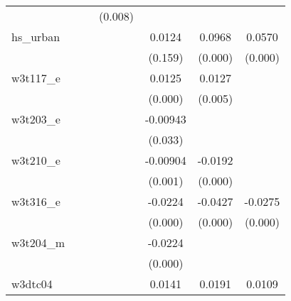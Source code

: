 {\begin{tabular}{l*{6}{c}}
            &                     &                     &     (0.008)         &                     &                     &                     \\
[1em]
hs\_urban    &                     &                     &                     &      0.0124         &      0.0968\sym{***}&      0.0570\sym{***}\\
            &                     &                     &                     &     (0.159)         &     (0.000)         &     (0.000)         \\
[1em]
w3t117\_e    &                     &                     &                     &      0.0125\sym{***}&      0.0127\sym{***}&                     \\
            &                     &                     &                     &     (0.000)         &     (0.005)         &                     \\
[1em]
w3t203\_e    &                     &                     &                     &    -0.00943\sym{**} &                     &                     \\
            &                     &                     &                     &     (0.033)         &                     &                     \\
[1em]
w3t210\_e    &                     &                     &                     &    -0.00904\sym{***}&     -0.0192\sym{***}&                     \\
            &                     &                     &                     &     (0.001)         &     (0.000)         &                     \\
[1em]
w3t316\_e    &                     &                     &                     &     -0.0224\sym{***}&     -0.0427\sym{***}&     -0.0275\sym{***}\\
            &                     &                     &                     &     (0.000)         &     (0.000)         &     (0.000)         \\
[1em]
w3t204\_m    &                     &                     &                     &     -0.0224\sym{***}&                     &                     \\
            &                     &                     &                     &     (0.000)         &                     &                     \\
[1em]
w3dtc04     &                     &                     &                     &      0.0141\sym{***}&      0.0191\sym{***}&      0.0109\sym{**} \\

\end{tabular}}
